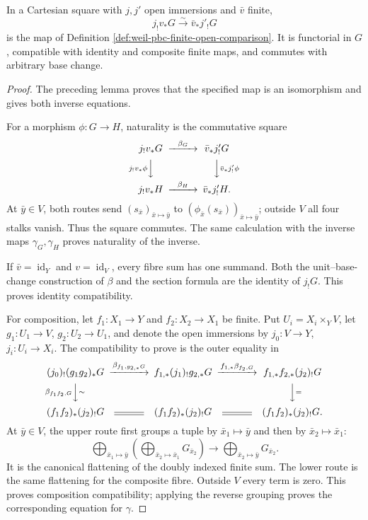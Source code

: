 \begin{lemma}
\label{lemma:weil-pbc-finite-pushforward-extension-zero}
In a Cartesian square with $j,j'$ open immersions and $\bar v$ finite,
\[
 j_!v_*G\xrightarrow{\sim}\bar v_*j'_!G
\]
is the map of Definition \ref{def:weil-pbc-finite-open-comparison}.  It is
functorial in $G$, compatible with identity and composite finite maps, and
commutes with arbitrary base change.
\end{lemma}
\begin{proof}

The preceding lemma proves that the specified map is an isomorphism and
gives both inverse equations.

For a morphism $\phi:G\to H$, naturality is the commutative square
\[
\begin{CD}
 j_!v_*G @>{\beta_G}>> \bar v_*j'_!G\\
 @V{j_!v_*\phi}VV @VV{\bar v_*j'_!\phi}V\\
 j_!v_*H @>{\beta_H}>> \bar v_*j'_!H.
\end{CD}
\]
At $\bar y\in V$, both routes send
$(s_{\bar x})_{\bar x\mapsto\bar y}$ to
$(\phi_{\bar x}(s_{\bar x}))_{\bar x\mapsto\bar y}$; outside $V$ all four
stalks vanish.  Thus the square commutes.  The same calculation with the
inverse maps $\gamma_G,\gamma_H$ proves naturality of the inverse.

If $\bar v=\operatorname{id}_Y$ and $v=\operatorname{id}_V$, every fibre sum
has one summand.  Both the unit--base-change construction of $\beta$ and the
section formula are the identity of $j_!G$.  This proves identity
compatibility.

For composition, let $f_1:X_1\to Y$ and $f_2:X_2\to X_1$ be finite.  Put
$U_i=X_i\times_YV$, let $g_1:U_1\to V$, $g_2:U_2\to U_1$, and denote the
open immersions by $j_0:V\to Y$, $j_i:U_i\to X_i$.  The compatibility to
prove is the outer equality in
\[
\begin{CD}
 (j_0)_!(g_1g_2)_*G
 @>{\beta_{f_1,g_{2,*}G}}>>
 f_{1,*}(j_1)_!g_{2,*}G
 @>{f_{1,*}\beta_{f_2,G}}>>
 f_{1,*}f_{2,*}(j_2)_!G\\
 @V{\beta_{f_1f_2,G}}V{\sim}V
 @. @VV{=}V\\
 (f_1f_2)_*(j_2)_!G @= (f_1f_2)_*(j_2)_!G
 @= (f_1f_2)_*(j_2)_!G .
\end{CD}
\]
At $\bar y\in V$, the upper route first groups a tuple by
$\bar x_1\mapsto\bar y$ and then by
$\bar x_2\mapsto\bar x_1$:
\[
 \bigoplus_{\bar x_1\mapsto\bar y}
 \left(\bigoplus_{\bar x_2\mapsto\bar x_1}G_{\bar x_2}\right)
 \longrightarrow
 \bigoplus_{\bar x_2\mapsto\bar y}G_{\bar x_2}.
\]
It is the canonical flattening of the doubly indexed finite sum.  The lower
route is the same flattening for the composite fibre.  Outside $V$ every
term is zero.  This proves composition compatibility; applying the reverse
grouping proves the corresponding equation for $\gamma$.


\end{proof}
